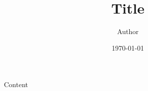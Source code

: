 \documentclass[]{article}
\begin{document}
\title{Title}
\author{Author}
\date{\today}
\maketitle

Content
\end{document}
